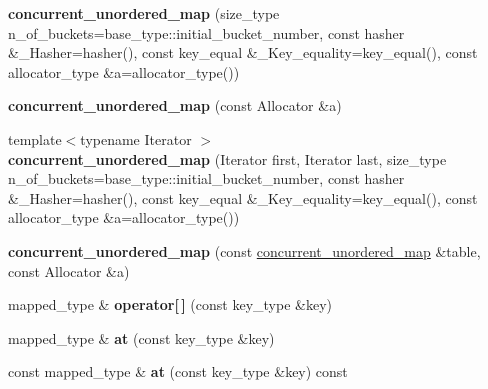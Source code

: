 \begin{DoxyCompactItemize}
\item 
\hypertarget{classtbb_1_1interface5_1_1concurrent__unordered__map_aeeabd4bffe47ad7a300ae896c06dc46c}{}{\bfseries concurrent\+\_\+unordered\+\_\+map} (size\+\_\+type n\+\_\+of\+\_\+buckets=base\+\_\+type\+::initial\+\_\+bucket\+\_\+number, const hasher \&\+\_\+\+Hasher=hasher(), const key\+\_\+equal \&\+\_\+\+Key\+\_\+equality=key\+\_\+equal(), const allocator\+\_\+type \&a=allocator\+\_\+type())\label{classtbb_1_1interface5_1_1concurrent__unordered__map_aeeabd4bffe47ad7a300ae896c06dc46c}

\item 
\hypertarget{classtbb_1_1interface5_1_1concurrent__unordered__map_ad0e15127e237c29c923db83fb509f624}{}{\bfseries concurrent\+\_\+unordered\+\_\+map} (const Allocator \&a)\label{classtbb_1_1interface5_1_1concurrent__unordered__map_ad0e15127e237c29c923db83fb509f624}

\item 
\hypertarget{classtbb_1_1interface5_1_1concurrent__unordered__map_ab494f2ac22495884f64985fba6ade501}{}{\footnotesize template$<$typename Iterator $>$ }\\{\bfseries concurrent\+\_\+unordered\+\_\+map} (Iterator first, Iterator last, size\+\_\+type n\+\_\+of\+\_\+buckets=base\+\_\+type\+::initial\+\_\+bucket\+\_\+number, const hasher \&\+\_\+\+Hasher=hasher(), const key\+\_\+equal \&\+\_\+\+Key\+\_\+equality=key\+\_\+equal(), const allocator\+\_\+type \&a=allocator\+\_\+type())\label{classtbb_1_1interface5_1_1concurrent__unordered__map_ab494f2ac22495884f64985fba6ade501}

\item 
\hypertarget{classtbb_1_1interface5_1_1concurrent__unordered__map_a2e1cce13f9fa458a616b424c84790c25}{}{\bfseries concurrent\+\_\+unordered\+\_\+map} (const \hyperlink{classtbb_1_1interface5_1_1concurrent__unordered__map}{concurrent\+\_\+unordered\+\_\+map} \&table, const Allocator \&a)\label{classtbb_1_1interface5_1_1concurrent__unordered__map_a2e1cce13f9fa458a616b424c84790c25}

\item 
\hypertarget{classtbb_1_1interface5_1_1concurrent__unordered__map_ae49177d89c80434a30aa346201abb986}{}mapped\+\_\+type \& {\bfseries operator\mbox{[}$\,$\mbox{]}} (const key\+\_\+type \&key)\label{classtbb_1_1interface5_1_1concurrent__unordered__map_ae49177d89c80434a30aa346201abb986}

\item 
\hypertarget{classtbb_1_1interface5_1_1concurrent__unordered__map_af2e1ccbd986686ef2e93c880a965e861}{}mapped\+\_\+type \& {\bfseries at} (const key\+\_\+type \&key)\label{classtbb_1_1interface5_1_1concurrent__unordered__map_af2e1ccbd986686ef2e93c880a965e861}

\item 
\hypertarget{classtbb_1_1interface5_1_1concurrent__unordered__map_a54173c11cd3bc91b491b3f83375868e4}{}const mapped\+\_\+type \& {\bfseries at} (const key\+\_\+type \&key) const \label{classtbb_1_1interface5_1_1concurrent__unordered__map_a54173c11cd3bc91b491b3f83375868e4}

\end{DoxyCompactItemize}


